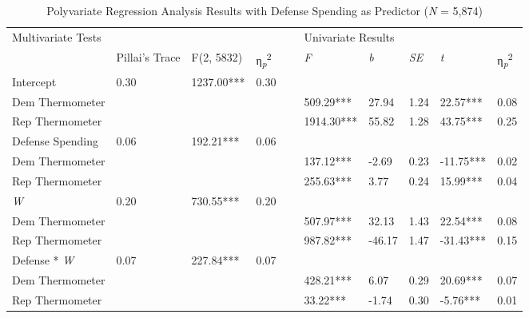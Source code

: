 \documentclass[authordate, meta, issue]{jote-new-article}
\begin{document}
	\begin{table}[H]
		\begin{fullwidth}
		\caption{Polyvariate Regression Analysis Results with Defense Spending as Predictor (\emph{N} = 5,874)}
		\begin{tabularx}{\linewidth}{@{} l l l l l l l l l l @{}}
			\hline \multicolumn{4}{l}{Multivariate Tests} &   & \multicolumn{5}{l}{Univariate Results}
			\\

			  & Pillai's Trace & F(2, 5832) & η\textsubscript{\emph{p}}\textsuperscript{2} &  &
			\emph{F} & \emph{b} & \emph{SE} & \emph{t} & η\textsubscript{\emph{p}}\textsuperscript{2} \\

			 Intercept & 0.30 & 1237.00*** & 0.30 &  &  &  &  &  &  \\

			 Dem Thermometer &  &  &  &  & 509.29*** & 27.94 & 1.24 & 22.57*** & 0.08 \\

			 Rep Thermometer &  &  &  &  & 1914.30*** & 55.82 & 1.28 & 43.75*** & 0.25
			\\

			 Defense Spending & 0.06 & 192.21*** & 0.06 &  &  &  &  &  &  \\

			 Dem Thermometer &  &  &  &  & 137.12*** & -2.69 & 0.23 & -11.75*** & 0.02
			\\

			 Rep Thermometer &  &  &  &  & 255.63*** & 3.77 & 0.24 & 15.99*** & 0.04 \\

			 \emph{W} & 0.20 & 730.55*** & 0.20 &  &  &  &  &  &  \\

			 Dem Thermometer &  &  &  &  & 507.97*** & 32.13 & 1.43 & 22.54*** & 0.08 \\

			 Rep Thermometer &  &  &  &  & 987.82*** & -46.17 & 1.47 & -31.43*** & 0.15
			\\

			 Defense * \emph{W} & 0.07 & 227.84*** & 0.07 &  &  &  &  &  &  \\

			 Dem Thermometer &  &  &  &  & 428.21*** & 6.07 & 0.29 & 20.69*** & 0.07
			\\

			 Rep Thermometer &  &  &  &  & 33.22*** & -1.74 & 0.30 & -5.76*** & 0.01
			\\


\end{tabularx}
\end{fullwidth}
\end{table}
\end{document}

